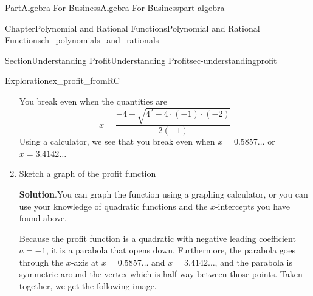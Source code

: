 \documentclass{tufte-book}
\newcommand{\blocktitlefont}{\relax}
\numberwithin{equation}{chapter}
\begin{document}
\begin{partptx}{Part}{Algebra For Business}{}{Algebra For Business}{}{}{part-algebra}
\begin{chapterptx}{Chapter}{Polynomial and Rational Functions}{}{Polynomial and Rational Functions}{}{}{ch_polynomials_and_rationals}
\begin{sectionptx}{Section}{Understanding Profit}{}{Understanding Profit}{}{}{sec-understandingprofit}
\begin{exploration}{Exploration}{}{ex_profit_fromRC}
\begin{enumerate}[font=\bfseries,label=(\alph*),ref=\alph*]
\par
You break even when the quantities are%
\begin{equation*}
x = \dfrac{-4 \pm \sqrt{4^2 - 4\cdot (-1)\cdot (-2)} }{2(-1)}
\end{equation*}
Using a calculator, we see that you break even when \(x=0.5857\dots\) or \(x=3.4142\dots\)%
\item{}Sketch a graph of the profit function%
\par\smallskip%
\noindent\textbf{\blocktitlefont Solution}.\hypertarget{ex_profit_fromRC-4-2}{}\quad{}You can graph the function using a graphing calculator, or you can use your knowledge of quadratic functions and the \(x\)-intercepts you have found above.%
\par
Because the profit function is a quadratic with negative  leading coefficient \(a=-1\), it is a parabola that opens down. Furthermore, the parabola goes through the \(x\)-axis at \(x=0.5857\dots\) and \(x=3.4142\dots\), and the parabola is symmetric around the vertex which is half way between those points. Taken together, we get the following image.%
\begin{image}{0.25}{0.5}{0.25}{}%
\end{image}
\end{enumerate}
\end{exploration}
\end{sectionptx}
\end{chapterptx}
\end{partptx}
\end{document}
